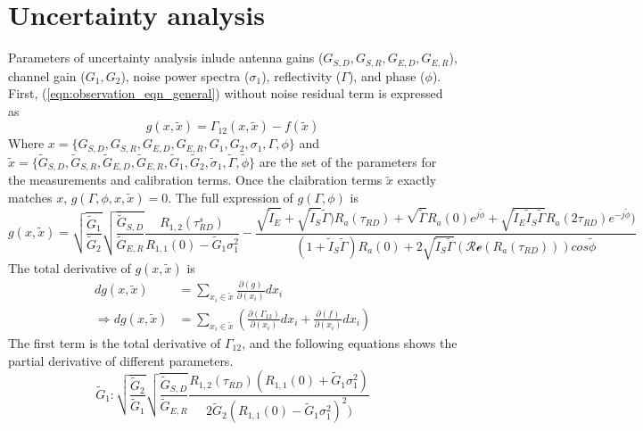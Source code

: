 \section{Uncertainty analysis}

Parameters of uncertainty analysis inlude antenna gains ($G_{S,D}, G_{S,R}, G_{E,D}, G_{E,R}$), channel gain ($G_1, G_2$), noise power spectra ($\sigma_1$), reflectivity ($\Gamma$), and phase ($\phi$).  First, (\ref{eqn:observation_eqn_general}) without noise residual  term is expressed as
\begin{equation}
g(x, \tilde{x}) = \Gamma_{12}(x, \tilde{x}) - f(\tilde{x})
\end{equation}
Where $x=\{G_{S,D}, G_{S,R}, G_{E,D}, G_{E,R}, G_1, G_2, \sigma_1, \Gamma, \phi\}$ and $\tilde{x}=\{\tilde{G}_{S,D}, \tilde{G}_{S,R}, \tilde{G}_{E,D}, \tilde{G}_{E,R}, \tilde{G}_1, \tilde{G}_2, \tilde{\sigma}_1, \tilde{\Gamma}, \tilde{\phi}\}$ are the set of the parameters for the measurements and calibration terms. Once the claibration terms $\tilde{x}$ exactly matches $x$, $g(\Gamma, \phi, x, \tilde{x}) = 0$. The full expression of $g(\Gamma,\phi)$ is
\begin{equation}
g(x,\tilde{x}) = \sqrt{\frac{\tilde{G}_1}{\tilde{G}_2}} \sqrt{\frac{\tilde{G}_{S,D}}{\tilde{G}_{E,R}}}  
\frac{R_{1,2}(\tau^s_{RD})}{R_{1,1}(0)-\tilde{G}_1 \sigma^2_1} -
 \frac
{\sqrt{\tilde{I}_E}+ \sqrt{\tilde{I}_S} \tilde{\Gamma})R_a(\tau_{RD})+
\sqrt{\tilde{\Gamma}}R_a(0)e^{j\tilde{\phi}}+
\sqrt{\tilde{I}_E \tilde{I}_S\tilde{\Gamma}}R_a(2\tau_{RD})e^{-j \tilde{\phi} } )
}
{(1+\tilde{I}_S \tilde{\Gamma})R_a(0)+
2 \sqrt{\tilde{I}_S\tilde{\Gamma}}(\mathcal{Re} (R_a(\tau_{RD})) )cos\tilde{\phi}
}                            
\end{equation}
The total derivative of $g(x,\tilde{x})$ is
\begin{align}
dg(x,\tilde{x})&=\sum_{x_i \in \tilde{x}} \frac{\partial(g)}{\partial(x_i)} dx_i \\
\Rightarrow dg(x,\tilde{x})&=\sum_{x_i \in \tilde{x}} (\frac{\partial(\Gamma_{12})}{\partial(x_i)} dx_i + \frac{\partial(f)}{\partial(x_i)}dx_i)
\end{align}
The first term is the total derivative of $\Gamma_{12}$, and the following equations shows the partial derivative of different parameters.
\begin{equation}
\tilde{G}_1 :
\sqrt{\frac{\tilde{G}_2}{\tilde{G}_1}}
\sqrt{\frac{\tilde{G}_{S,D}}{\tilde{G}_{E,R}}}
\frac{R_{1,2}(\tau_{RD}) (R_{1,1}(0) + \tilde{G}_1 \sigma_1^2)}
{2\tilde{G}_2(R_{1,1}(0) - \tilde{G}_1 \sigma_1^2)^2 )} 
\end{equation}
